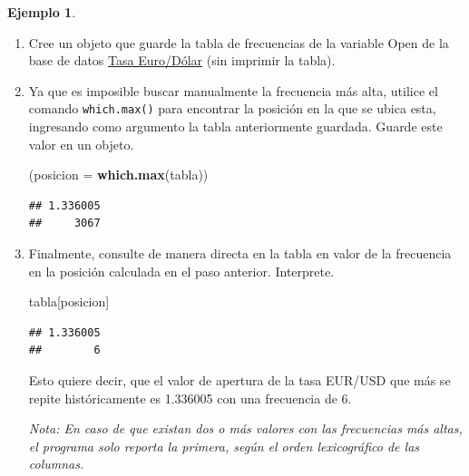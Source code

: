 \documentclass[
  11pt,
]{book}
\newenvironment{Shaded}{\begin{snugshade}}{\end{snugshade}}
\newcommand{\AttributeTok}[1]{\textcolor[rgb]{0.13,0.29,0.53}{#1}}
\newcommand{\FunctionTok}[1]{\textcolor[rgb]{0.13,0.29,0.53}{\textbf{#1}}}
\newcommand{\NormalTok}[1]{#1}
\newcommand{\OtherTok}[1]{\textcolor[rgb]{0.56,0.35,0.01}{#1}}
\newcommand{\SpecialCharTok}[1]{\textcolor[rgb]{0.81,0.36,0.00}{\textbf{#1}}}
\theoremstyle{definition}
\theoremstyle{definition}
\newtheorem{example}{Ejemplo}[chapter]
\theoremstyle{definition}
\theoremstyle{definition}
\theoremstyle{remark}
\begin{document}
\begin{example}
\leavevmode

\begin{enumerate}
\def\labelenumi{\arabic{enumi}.}
\item
  Cree un objeto que guarde la tabla de frecuencias de la variable Open de la base de datos \hyperref[TasaEURUSD]{Tasa Euro/Dólar} (sin imprimir la tabla).

\begin{Shaded}
\end{Shaded}
\item
  Ya que es imposible buscar manualmente la frecuencia más alta, utilice el comando \texttt{which.max()} para encontrar la posición en la que se ubica esta, ingresando como argumento la tabla anteriormente guardada. Guarde este valor en un objeto.

\begin{Shaded}
\begin{Highlighting}[]
\NormalTok{(}\AttributeTok{posicion =} \FunctionTok{which.max}\NormalTok{(tabla))}
\end{Highlighting}
\end{Shaded}

\begin{verbatim}
## 1.336005 
##     3067
\end{verbatim}
\item
  Finalmente, consulte de manera directa en la tabla en valor de la frecuencia en la posición calculada en el paso anterior. Interprete.

\begin{Shaded}
\begin{Highlighting}[]
\NormalTok{tabla[posicion]}
\end{Highlighting}
\end{Shaded}

\begin{verbatim}
## 1.336005 
##        6
\end{verbatim}

  Esto quiere decir, que el valor de apertura de la tasa EUR/USD que más se repite históricamente es 1.336005 con una frecuencia de 6.

  \emph{Nota: En caso de que existan dos o más valores con las frecuencias más altas, el programa solo reporta la primera, según el orden lexicográfico de las columnas.}
\end{enumerate}

\end{example}
\end{document}
